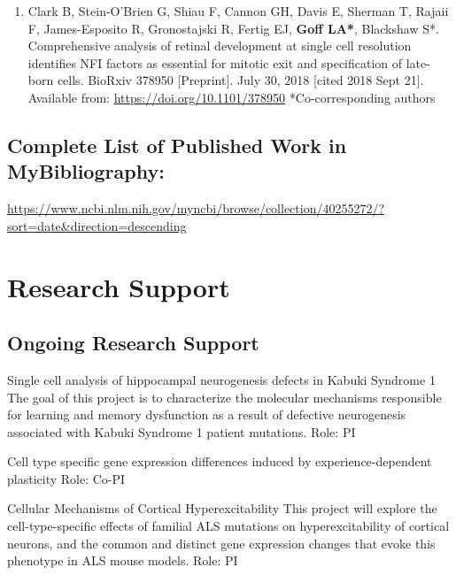 \documentclass{nihbiosketch}
\begin{document}
\begin{enumerate}
\begin{enumerate}
\item Clark B, Stein-O’Brien G, Shiau F, Cannon GH, Davis E, Sherman T, Rajaii F, James-Esposito R, Gronostajski R, Fertig EJ, \textbf{Goff LA*}, Blackshaw S*. Comprehensive analysis of retinal development at single cell resolution identifies NFI factors as essential for mitotic exit and specification of late-born cells. BioRxiv 378950 [Preprint]. July 30, 2018 [cited 2018 Sept 21]. Available from: \url{https://doi.org/10.1101/378950} *Co-corresponding authors

\end{enumerate}

\end{enumerate}

\subsection*{Complete List of Published Work in MyBibliography:} 
\url{https://www.ncbi.nlm.nih.gov/myncbi/browse/collection/40255272/?sort=date&direction=descending}


\section{Research Support}

\subsection*{Ongoing Research Support}

{Single cell analysis of hippocampal neurogenesis defects in Kabuki Syndrome 1}
{The goal of this project is to characterize the molecular mechanisms responsible for learning and memory dysfunction as a result of defective neurogenesis associated with Kabuki Syndrome 1 patient mutations.}
{Role: PI}

\bigskip


{Cell type specific gene expression differences induced by experience-dependent plasticity}
{Role: Co-PI}

\bigskip

{Cellular Mechanisms of Cortical Hyperexcitability}
{This project will explore the cell-type-specific effects of familial ALS mutations on hyperexcitability of cortical neurons, and the common and distinct gene expression changes that evoke this phenotype in ALS mouse models.}
{Role: PI}
\end{document}
